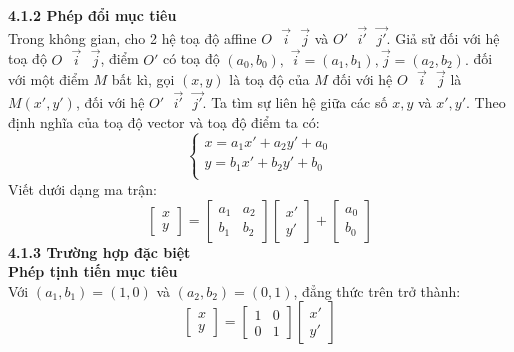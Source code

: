 \documentclass[12pt,a4]{article}
\begin{document}
\begin{titlepage}
     \textbf{4.1.2 Phép đổi mục tiêu}\\
    Trong không gian, cho 2 hệ toạ độ affine $O\text{ }\vec{i}\text{ }\vec{j}$ và $O'\text{ }\vec{i'}\text{ }\vec{j'}$. Giả sử đối với hệ toạ độ $O\text{ }\vec{i}\text{ }\vec{j}$, điểm $O'$ có toạ độ $(a_0,b_0),$ $\vec{i} = (a_1,b_1),\vec{j} = (a_2,b_2).$ đối với một điểm $M$ bất kì, gọi $(x,y)$ là toạ độ của $M$ đối với hệ $O\text{ }\vec{i}\text{ }\vec{j}$ là $M(x',y')$, đối với hệ $O'\text{ }\vec{i'}\text{ }\vec{j'}$. Ta tìm sự liên hệ giữa các số $x,y$ và $x',y'$. Theo định nghĩa của toạ độ vector và toạ độ điểm ta có:
    \[
        \begin{cases}
            x = a_1x' + a_2 y' + a_0\\
            y = b_1x' + b_2 y' + b_0\\
        \end{cases}
    \]
    Viết dưới dạng ma trận:
    \[
        \begin{bmatrix}
            x\\
            y
        \end{bmatrix}
        =
        \begin{bmatrix}
            a_1 & a_2\\
            b_1 & b_2
        \end{bmatrix}
        \begin{bmatrix}
            x'\\
            y'
        \end{bmatrix}
        +
        \begin{bmatrix}
        a_0\\
        b_0
        \end{bmatrix}
    \]
\textbf{4.1.3 Trường hợp đặc biệt}\\
\textbf{Phép tịnh tiến mục tiêu}\\
    Với $(a_1, b_1) = (1,0)$ và $(a_2, b_2) = (0,1)$, đẳng thức trên trở thành:  
    \[
        \begin{bmatrix}
            x\\
            y
        \end{bmatrix}
        =
        \begin{bmatrix}
            1& 0\\
            0 & 1
        \end{bmatrix}
        \begin{bmatrix}
            x'\\
            y'
        \end{bmatrix}
\]
\end{titlepage}
\end{document}
